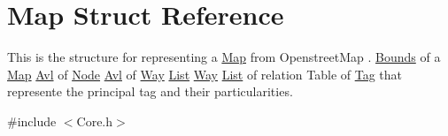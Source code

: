 \hypertarget{structMap}{\section{Map Struct Reference}
\label{structMap}
}


This is the structure for representing a \hyperlink{structMap}{Map} from Openstreet\-Map . \hyperlink{structBounds}{Bounds} of a \hyperlink{structMap}{Map} \hyperlink{structAvl}{Avl} of \hyperlink{structNode}{Node} \hyperlink{structAvl}{Avl} of \hyperlink{structWay}{Way} \hyperlink{structList}{List} \hyperlink{structWay}{Way} \hyperlink{structList}{List} of relation Table of \hyperlink{structTag}{Tag} that represente the principal tag and their particularities.  




{\ttfamily \#include $<$Core.\-h$>$}

